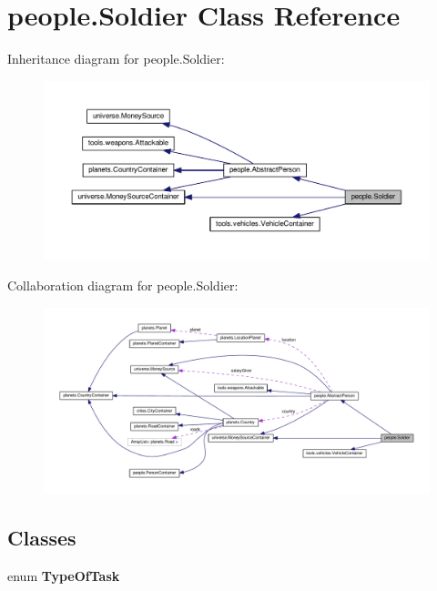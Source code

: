 \hypertarget{classpeople_1_1_soldier}{}\section{people.\+Soldier Class Reference}
\label{classpeople_1_1_soldier}


Inheritance diagram for people.\+Soldier\+:\nopagebreak
\begin{figure}[H]
\begin{center}
\leavevmode
\includegraphics[width=350pt]{classpeople_1_1_soldier__inherit__graph}
\end{center}
\end{figure}


Collaboration diagram for people.\+Soldier\+:\nopagebreak
\begin{figure}[H]
\begin{center}
\leavevmode
\includegraphics[width=350pt]{classpeople_1_1_soldier__coll__graph}
\end{center}
\end{figure}
\subsection*{Classes}
\begin{DoxyCompactItemize}
\item 
enum {\bfseries Type\+Of\+Task}
\end{DoxyCompactItemize}

